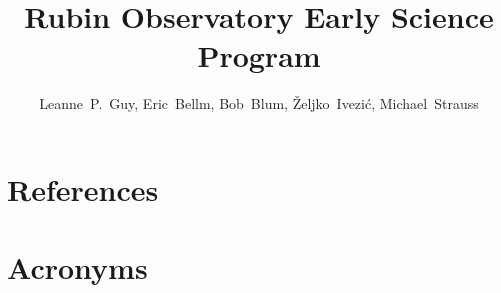 \documentclass[DM,authoryear,toc]{lsstdoc}
\title{Rubin Observatory Early Science Program}
\author{%
Leanne~P.~Guy, Eric~Bellm, Bob~Blum, \v{Z}eljko~Ivezi\'{c}, Michael~Strauss}
\date{\vcsDate}
\begin{document}
\maketitle


\clearpage





%







%

%

\appendix
\section{References} \label{sec:bib}
\renewcommand{\refname}{} %


\section{Acronyms} \label{sec:acronyms}

\end{document}
